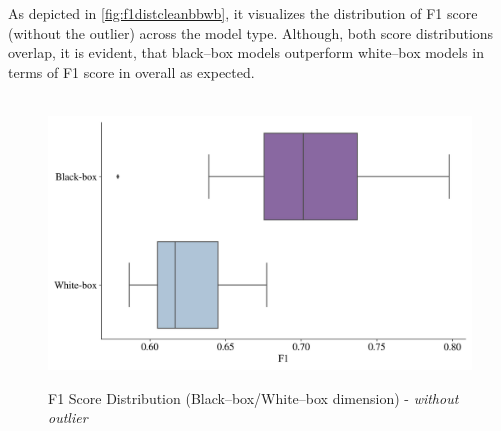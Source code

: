 \newpage
As depicted in \autoref{fig:f1distcleanbbwb}, it visualizes the distribution of F1 score (without the outlier) across the model type. Although, both score distributions overlap, it is evident, that black--box models outperform white--box models in terms of F1 score in overall as expected.
\begin{figure}[H]
    \centering
    \caption{F1 Score Distribution (Black--box/White--box dimension) - \textit{without outlier}}\vspace{0.5em}
    \label{fig:f1distcleanbbwb}\
    \includegraphics[width=140mm]{Figures/F1_wo_outliers_Distribution_BB_WB.jpg}

    \vspace{-1em}
\end{figure}

